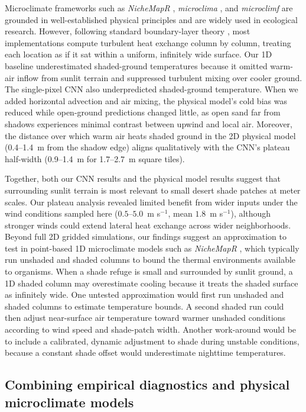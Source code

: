 \documentclass[12pt]{article}
\begin{document}
\noindent Microclimate frameworks such as \textit{NicheMapR} \citep{kearney_2017}, \textit{microclima} \citep{maclean_2019}, and \textit{microclimf} \citep{maclean_2026} are grounded in well-established physical principles \citep{briscoe_2023} and are widely used in ecological research. However, following standard boundary-layer theory \citep{brutsaert_1982}, most implementations compute turbulent heat exchange column by column, treating each location as if it sat within a uniform, infinitely wide surface. Our 1D baseline \citep{Itzkovitch2025} underestimated shaded-ground temperatures because it omitted warm-air inflow from sunlit terrain and suppressed turbulent mixing over cooler ground. The single-pixel CNN also underpredicted shaded-ground temperature. When we added horizontal advection and air mixing, the physical model's cold bias was reduced while open-ground predictions changed little, as open sand far from shadows experiences minimal contrast between upwind and local air. Moreover, the distance over which warm air heats shaded ground in the 2D physical model (0.4--1.4~m from the shadow edge) aligns qualitatively with the CNN's plateau half-width (0.9--1.4~m for 1.7--2.7~m square tiles). 

Together, both our CNN results and the physical model results suggest that surrounding sunlit terrain is most relevant to small desert shade patches at meter scales. Our plateau analysis revealed limited benefit from wider inputs under the wind conditions sampled here ($0.5$--$5.0$~m s$^{-1}$, mean $1.8$~m s$^{-1}$), although stronger winds could extend lateral heat exchange across wider neighborhoods. Beyond full 2D gridded simulations, our findings suggest an approximation to test in point-based 1D microclimate models such as \textit{NicheMapR} \citep{kearney_2017}, which typically run unshaded and shaded columns to bound the thermal environments available to organisms. When a shade refuge is small and surrounded by sunlit ground, a 1D shaded column may overestimate cooling because it treats the shaded surface as infinitely wide. One untested approximation would first run unshaded and shaded columns to estimate temperature bounds. A second shaded run could then adjust near-surface air temperature toward warmer unshaded conditions according to wind speed and shade-patch width. Another work-around would be to include a calibrated, dynamic adjustment to shade during unstable conditions, because a constant shade offset would underestimate nighttime temperatures.

\subsection{Combining empirical diagnostics and physical microclimate models}
\end{document}
